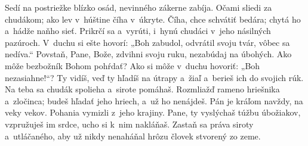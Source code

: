 Sedí na postriežke blízko osád,
nevinného zákerne zabíja.
\versseparator
Očami sliedi za chudákom;
ako lev v~húštine číha v~úkryte.
\versseparator
Číha, chce schvátiť bedára;
chytá ho a~hádže naňho sieť.
\versseparator
Prikrčí sa a~vyrúti, i~hynú chudáci
v~jeho násilných pazúroch.
\versseparator
V~duchu si ešte hovorí: „Boh zabudol,
odvrátil svoju tvár, vôbec sa nedíva.“
\versseparator
Povstaň, Pane, Bože, zdvihni svoju ruku,
nezabúdaj na úbohých.
\versseparator
Ako môže bezbožník Bohom pohŕdať?
Ako si môže v~duchu hovoriť: „Boh nezasiahne!“?
\versseparator
Ty vidíš, veď ty hľadíš na útrapy a~žiaľ
a~berieš ich do svojich rúk.
\versseparator
Na teba sa chudák spolieha
a~sirote pomáhaš.
\versseparator
Rozmliažď rameno hriešnika a~zločinca;
budeš hľadať jeho hriech, a~už ho nenájdeš.
\versseparator
Pán je kráľom navždy, na veky vekov.
Pohania vymizli z~jeho krajiny.
\versseparator
Pane, ty vyslýchaš túžbu úbožiakov,
vzpružuješ im srdce, ucho si k~nim nakláňaš.
\versseparator
Zastaň sa práva siroty a~utláčaného,
aby už nikdy nenaháňal hrôzu človek stvorený zo zeme.
